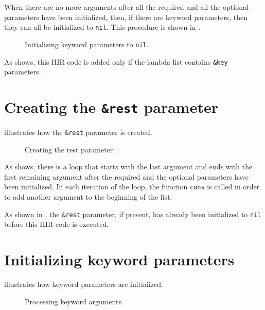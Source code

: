 When there are no more arguments after all the required and all the
optional parameters have been initialized, then, if there are keyword
parameters, then they can all be initialized to \texttt{nil}.
This procedure is shown in .

\begin{figure}
\begin{center}
\end{center}
\caption{\label{fig-no-more-arguments}
Initializing keyword parameters to \texttt{nil}.}
\end{figure}

As  shows, this HIR code is added only
if the lambda list contains \texttt{\&key} parameters.

\section{Creating the \texttt{\&rest} parameter}

 illustrates how the \texttt{\&rest}
parameter is created.

\begin{figure}
\begin{center}
\end{center}
\caption{\label{fig-create-rest-parameter}
Creating the rest parameter.}
\end{figure}

As  shows, there is a loop that
starts with the last argument and ends with the first remaining
argument after the required and the optional parameters have been
initialized.  In each iteration of the loop, the function
\texttt{cons} is called in order to add another argument to the
beginning of the list.

As shown in , the \texttt{\&rest}
parameter, if present, has already been initialized to \texttt{nil}
before this HIR code is executed.

\section{Initializing keyword parameters}

 illustrates how keyword
parameters are initialized.

\begin{figure}
\begin{center}
\end{center}
\caption{\label{fig-process-keyword-arguments}
Processing keyword arguments.}
\end{figure}

